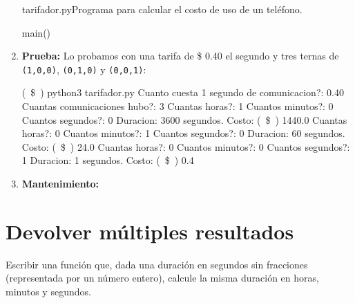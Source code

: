 \begin{solucion}
\begin{enumerate}
\begin{codigo}{\label{tarifador} tarifador.py}{Programa para calcular el costo
    de uso de un teléfono.}
\begin{codigo-python}
main()
\end{codigo-python}
\end{codigo}

\item {\bf Prueba:} Lo probamos con una tarifa de \$ 0.40 el segundo y tres
ternas de \lstinline!(1,0,0)!, \lstinline!(0,1,0)! y \lstinline!(0,0,1)!:

\begin{codigo-nohl-sn}
(~\$~) python3 tarifador.py
Cuanto cuesta 1 segundo de comunicacion?: 0.40
Cuantas comunicaciones hubo?: 3
Cuantas horas?: 1
Cuantos minutos?: 0
Cuantos segundos?: 0
Duracion: 3600 segundos. Costo: (~\$~) 1440.0
Cuantas horas?: 0
Cuantos minutos?: 1
Cuantos segundos?: 0
Duracion: 60 segundos. Costo: (~\$~) 24.0
Cuantas horas?: 0
Cuantos minutos?: 0
Cuantos segundos?: 1
Duracion: 1 segundos. Costo: (~\$~) 0.4
\end{codigo-nohl-sn}

\item {\bf Mantenimiento:}

\end{enumerate}
\end{solucion}

\section{Devolver múltiples resultados}
\label{fun:multiple_return}

\begin{problemac}
Escribir una función que, dada una duración en segundos sin fracciones
(representada por un número entero), calcule la misma duración en horas,
minutos y segundos.
\end{problemac}

